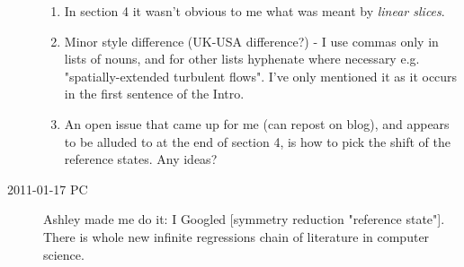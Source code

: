 \begin{description}
\begin{enumerate}
  \item In section 4 it wasn't obvious to me what was meant by {\em linear slices}.
  \item Minor style difference (UK-USA difference?) - I use commas only
  in lists of nouns, and for other lists hyphenate where necessary e.g.
  "spatially-extended turbulent flows".  I've only mentioned it as it
  occurs in the first sentence of the Intro.

  \item An open issue that came up for me (can repost on blog), and
  appears to be alluded to at the end of section 4, is how to pick the
  shift of the reference states.  Any ideas?

\end{enumerate}


\item[2011-01-17 PC] Ashley made me do it: I Googled [symmetry reduction
"reference state"]. There is whole new infinite regressions chain of
literature in computer science.


\end{description}




\renewcommand{\ssp}{a}
